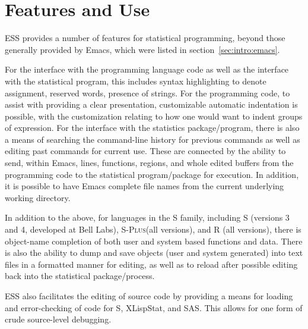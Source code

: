 \documentclass{article}
\newcommand*{\Splus}{\textsc{S-Plus}}
\begin{document}
\section{Features and Use}
\label{sec:basic}


ESS provides a number of features for statistical programming, beyond
those generally provided by Emacs, which were listed in
section~\ref{sec:intro:emacs}.

For the interface with the programming language code as well as the
interface with the statistical program, this includes syntax
highlighting to denote assignment, reserved words, presence of
strings.  For the programming code, to assist with providing a clear
presentation, customizable automatic indentation is possible, with the
customization relating to how one would want to indent groups of
expression.  For the interface with the statistics package/program,
there is also a means of searching the command-line history for
previous commands as well as editing past commands for current use.
These are connected by the ability to send, within Emacs, lines,
functions, regions, and whole edited buffers from the programming code
to the statistical program/package for execution.  In addition, it is
possible to have Emacs complete file names from the current underlying
working directory.

In addition to the above, for languages in the S family, including S
(versions 3 and 4, developed at Bell Labs), \Splus (all versions), and
R (all versions), there is object-name completion of both user and
system based functions and data.  There is also the ability to dump
and save objects (user and system generated) into text files in a
formatted manner for editing, as well as to reload after possible
editing back into the statistical package/process.

ESS also facilitates the editing of source code by providing a means
for loading and error-checking of code for S, XLispStat, and SAS.  This
allows for one form of crude source-level debugging.
\end{document}
